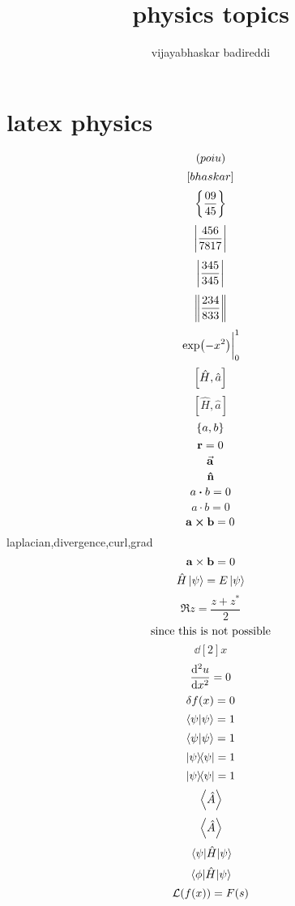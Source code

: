 \documentclass[12pt]{article}
\title{physics topics}
\author{vijayabhaskar badireddi}
\begin{document}

\section*{latex physics}

\[\pqty{poiu}\]
\[\bqty{bhaskar}\]
\[\Bqty{\frac{09}{45}}\]
\[\vqty{\frac{456}{7817}}\]
\[\abs{\frac{345}{345}}\]
\[\norm{\frac{234}{833}}\]
\[\eval{\exp(-x^2)}_{0}^{1}\]
\[\comm{\hat{H}}{\hat{a}}\]
\[[\hat{H},\hat{a}]\]
\[\pb{a}{b}\]
\[\vb{r}=0\]
\[\va{a}\]
\[\vu{n}\]
\[{a}\vdot{b}=0\]
\[a\cdot{b}=0\]
\[\vb{a}\cp\vb{b}=0\]
laplacian,divergence,curl,grad
\[\vb{a}\times\vb{b}=0\]
\[\hat{H}\ket{\psi}=E\ket{\psi}\]
\[\Re{z}=\frac{z+z^*}{2}\]
\[\qq{since this is not possible}\]
\[\dd[2]{x}\]
\[\dv[2]{u}{x}=0\]
\[\var{f(x)}=0\]
\[\braket{\psi}=1\]
\[\ip{\psi}=1\]
\[\op{\psi}=1\]
\[\ketbra{\psi}=1\]
\[\ev{\hat{A}}\]
\[\expval{\hat{A}}\]
\[\expval{\hat{H}}{\psi}\]
\[\mel{\phi}{\hat{H}}{\psi}\]
\[\mathcal{L}\qty(f(x))=F(s)\]
\end{document}
